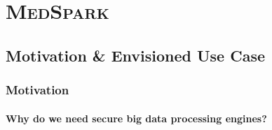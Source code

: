 \documentclass[10pt,    %
    english,            %
    xcolor=table,       %
    envcountsect,        %
    aspectratio=169     %
]{beamer}
\newcommand{\projName}{\textsc{MedSpark}\xspace}
\begin{document}

\section{\projName}
\label{sec:medspark}
\sectionframe

\subsection{Motivation \& Envisioned Use Case}

\begin{frame}
    \frametitle{Motivation}
    \framesubtitle{Why do we need secure big data processing engines?}

    \vspace{-20pt}

    \begin{figure}[H]
        \centering
        \resizebox{0.9\linewidth}{!}{}
    \end{figure}

\end{frame}
\end{document}
